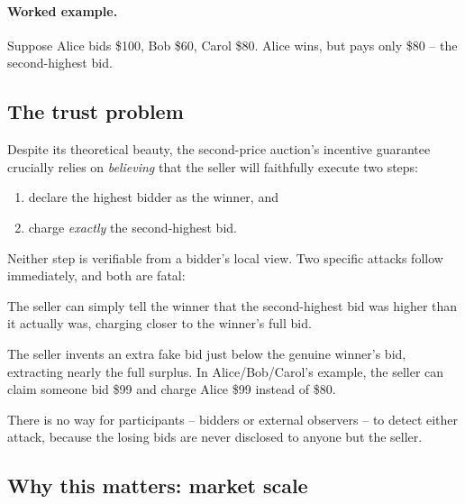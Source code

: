 \documentclass[11pt,a4paper]{article}
\begin{document}
\paragraph{Worked example.} Suppose Alice bids \$100, Bob \$60, Carol \$80.
Alice wins, but pays only \$80 -- the second-highest bid.

\subsection{The trust problem}

Despite its theoretical beauty, the second-price auction's incentive guarantee
crucially relies on \emph{believing} that the seller will faithfully execute
two steps:
\begin{enumerate}[leftmargin=*,nosep]
\item declare the highest bidder as the winner, and
\item charge \emph{exactly} the second-highest bid.
\end{enumerate}
Neither step is verifiable from a bidder's local view. Two specific attacks
follow immediately, and both are fatal:
\begin{description}[leftmargin=1em,style=nextline]
\item[Attack A: lying about the second price.]
The seller can simply tell the winner that the second-highest bid was higher
than it actually was, charging closer to the winner's full bid.
\item[Attack B: fabricating a phantom bid.]
The seller invents an extra fake bid just below the genuine winner's bid,
extracting nearly the full surplus. In Alice/Bob/Carol's example, the seller
can claim someone bid \$99 and charge Alice \$99 instead of \$80.
\end{description}
There is no way for participants -- bidders or external observers -- to detect
either attack, because the losing bids are never disclosed to anyone but the
seller.

\subsection{Why this matters: market scale}
\end{document}
